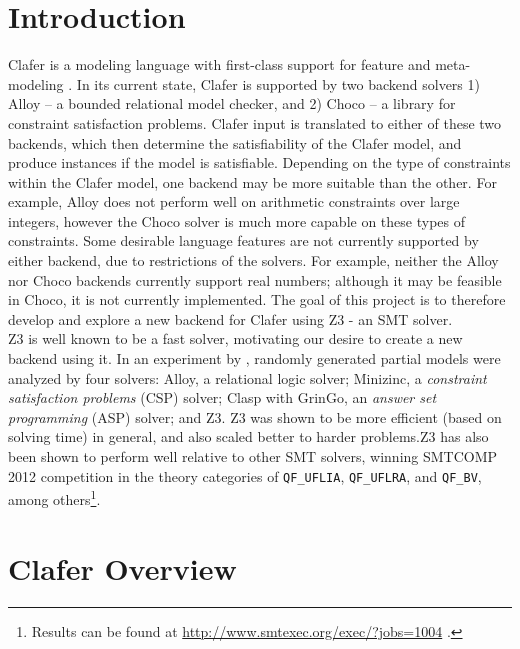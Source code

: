 \documentclass{article}
\begin{document}
\section{Introduction}
Clafer is a modeling language with first-class support for feature and meta-modeling \cite{BakClaferSLE2010}. In its current state, Clafer is supported by two backend solvers 1) Alloy -- a bounded relational model checker, and 2) Choco -- a library for constraint satisfaction problems. Clafer input is translated to either of these two backends, which then determine the satisfiability of the Clafer model, and produce instances if the model is satisfiable. Depending on the type of constraints within the Clafer model, one backend may be more suitable than the other. For example, Alloy does not perform well on arithmetic constraints over large integers, however the Choco solver is much more capable on these types of constraints. Some desirable language features are not currently supported by either backend, due to restrictions of the solvers. For example, neither the Alloy nor Choco backends currently support real numbers; although it may be feasible in Choco, it is not currently implemented. The goal of this project is to therefore develop and explore a new backend for Clafer using Z3 - an SMT solver. \\
\indent Z3 is well known to be a fast solver, motivating our desire to create a new backend using it. In an experiment by \cite{Saadatpanah2012}, randomly generated partial models were analyzed by four solvers: Alloy, a relational logic solver; Minizinc, a  \textit{constraint satisfaction problems} (CSP) solver; Clasp with GrinGo, an \textit{answer set programming} (ASP) solver; and Z3. Z3 was shown to be more efficient (based on solving time) in general, and also scaled better to harder problems.Z3 has also been shown to perform well relative to other SMT solvers, winning SMTCOMP 2012 competition in the theory categories of \texttt{QF\_UFLIA}, \texttt{QF\_UFLRA}, and \texttt{QF\_BV}, among others\footnote{Results can be found at \url{http://www.smtexec.org/exec/?jobs=1004} .}.

\section{Clafer Overview}
\end{document}
